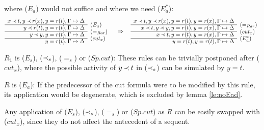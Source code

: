 \begin{PROOF}
\begin{LS}
\begin{LSA}
where ($E_a$) would not suffice and where we need ($E_a^*$):
{\scriptsize  \[ \begin{array}{rl}
x\Incl t,  y \Incl r(x),  y=r(t), \GSD \\ \cline{1-1}
 y \Incl r(t),  y=r(t), \GSD  & \rabove{(E_a)} \\ \cline{1-1}
 y \Incl y,  y=r(t), \GSD  & \rabove{(=_{Rar})} \\ \cline{1-1}
  y=r(t), \GSD  & \rabove{(cut_x)} \end{array} \conv
  \begin{array}{rl}
x\Incl t,  y \Incl r(x),  y=r(t), y=r(x), \GSD \\ \cline{1-1}
x\Incl t,  y \Incl y,  y=r(t), y=r(x), \GSD  & \rabove{(=_{Rar})} \\ \cline{1-1}
 x \Incl t,  y=r(t), y=r(x), \GSD  & \rabove{(cut_x)} \\ \cline{1-1}
  y=r(t), y=r(t), \GSD  & \rabove{(E_a^*)} \end{array} \] }
\item $R_1$ is ($E_s$), ($\mathbin{\prec}_s$), ($=_s$) or ($Sp.cut$):
These rules can be trivially postponed after ($cut_x$), where the possible
activity of $y\mathbin{\prec} t$ in ($\mathbin{\prec}_s$) can be simulated by $y=t$.
\end{LSA}
%
\item $R$ is ($E_a$): If the predecessor of the cut formula were to be
modified by this rule, its application would be degenerate, which is
excluded by lemma \ref{le:noEad}.
\item Any application of ($E_s$), ($\mathbin{\prec}_s$), ($=_s$) or ($Sp.cut$) as $R$
can be easily swapped with ($cut_x$), since they do not affect the antecedent of a sequent.
\end{LS}
\end{PROOF}
%

